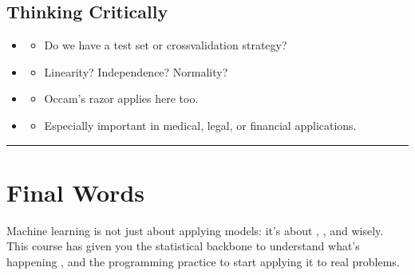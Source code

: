 \documentclass[letterpaper,10pt,english]{jupyterBook}
\begin{document}
\subsection{Thinking Critically}
\label{\detokenize{conclusion:thinking-critically}}\begin{itemize}
\item {} 
\sphinxAtStartPar
{}
\begin{itemize}
\item {} 
\sphinxAtStartPar
Do we have a test set or cross\sphinxhyphen{}validation strategy?

\end{itemize}

\item {} 
\sphinxAtStartPar
{}
\begin{itemize}
\item {} 
\sphinxAtStartPar
Linearity? Independence? Normality?

\end{itemize}

\item {} 
\sphinxAtStartPar
{}
\begin{itemize}
\item {} 
\sphinxAtStartPar
Occam’s razor applies here too.

\end{itemize}

\item {} 
\sphinxAtStartPar
{}
\begin{itemize}
\item {} 
\sphinxAtStartPar
Especially important in medical, legal, or financial applications.

\end{itemize}

\end{itemize}


\bigskip\hrule\bigskip



\section{Final Words}
\label{\detokenize{conclusion:final-words}}
\sphinxAtStartPar
Machine learning is not just about applying models: it’s about , , and  wisely. This course has given you the statistical backbone to understand what’s happening , and the programming practice to start applying it to real problems.
\end{document}
